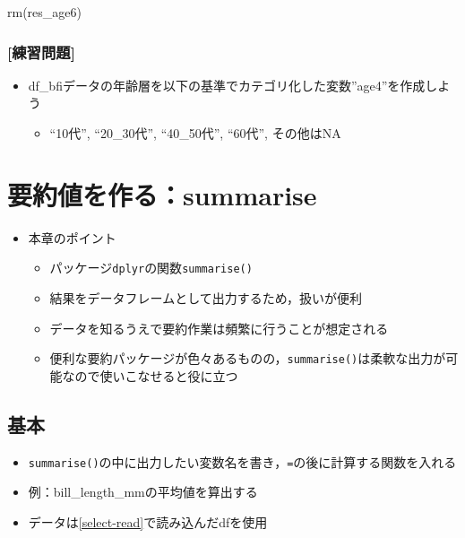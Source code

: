 \documentclass[
  xelatex,ja=standard, b5paper]{bxjsbook}
\newenvironment{Shaded}{\begin{snugshade}}{\end{snugshade}}
\newcommand{\FunctionTok}[1]{\textcolor[rgb]{0.00,0.00,0.00}{#1}}
\newcommand{\NormalTok}[1]{#1}
\providecommand{\tightlist}{%
  \setlength{\itemsep}{0pt}\setlength{\parskip}{0pt}}
\begin{document}
\begin{Shaded}
\begin{Highlighting}[]
\FunctionTok{rm}\NormalTok{(res\_age6)}
\end{Highlighting}
\end{Shaded}

\hypertarget{ux7df4ux7fd2ux554fux984c-14}{%
\subsection{{[}練習問題{]}}\label{ux7df4ux7fd2ux554fux984c-14}}

\begin{itemize}
\tightlist
\item
  df\_bfiデータの年齢層を以下の基準でカテゴリ化した変数''age4''を作成しよう

  \begin{itemize}
  \tightlist
  \item
    ``10代'', ``20\_30代'', ``40\_50代'', ``60代'', その他はNA
  \end{itemize}
\end{itemize}

\hypertarget{summarise}{%
\chapter{要約値を作る：summarise}\label{summarise}}

\begin{itemize}
\tightlist
\item
  本章のポイント

  \begin{itemize}
  \tightlist
  \item
    パッケージ\texttt{dplyr}の関数\texttt{summarise()}
  \item
    結果をデータフレームとして出力するため，扱いが便利
  \item
    データを知るうえで要約作業は頻繁に行うことが想定される
  \item
    便利な要約パッケージが色々あるものの，\texttt{summarise()}は柔軟な出力が可能なので使いこなせると役に立つ
  \end{itemize}
\end{itemize}

\hypertarget{su-st}{%
\section{基本}\label{su-st}}

\begin{itemize}
\tightlist
\item
  \texttt{summarise()}の中に出力したい変数名を書き，\texttt{=}の後に計算する関数を入れる
\item
  例：bill\_length\_mmの平均値を算出する
\item
  データは\ref{select-read}で読み込んだdfを使用
\end{itemize}
\end{document}
